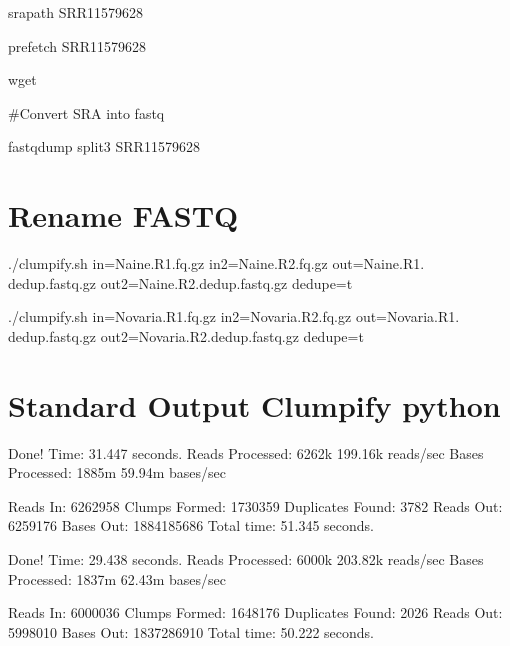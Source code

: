 \documentclass[letterpaper,10pt,english]{sphinxhowto}
\begin{document}
\sphinxAtStartPar
srapath SRR11579628

\sphinxAtStartPar
prefetch SRR11579628

\sphinxAtStartPar
wget 

\sphinxAtStartPar
\#Convert SRA into fastq

\sphinxAtStartPar
fastq\sphinxhyphen{}dump \textendash{}split\sphinxhyphen{}3 SRR11579628


\section{Rename FASTQ}
\label{\detokenize{CNV:rename-fastq}}
\sphinxAtStartPar
{}

\sphinxAtStartPar
{}

\sphinxAtStartPar
./clumpify.sh in=Naine.R1.fq.gz in2=Naine.R2.fq.gz out=Naine.R1.
dedup.fastq.gz out2=Naine.R2.dedup.fastq.gz dedupe=t

\sphinxAtStartPar
./clumpify.sh in=Novaria.R1.fq.gz in2=Novaria.R2.fq.gz out=Novaria.R1.
dedup.fastq.gz out2=Novaria.R2.dedup.fastq.gz dedupe=t


\section{Standard Output Clumpify python}
\label{\detokenize{CNV:standard-output-clumpify-python}}
\sphinxAtStartPar
Done!
Time:                           31.447 seconds.
Reads Processed:         6262k  199.16k reads/sec
Bases Processed:         1885m  59.94m bases/sec

\sphinxAtStartPar
Reads In:              6262958
Clumps Formed:         1730359
Duplicates Found:         3782
Reads Out:             6259176
Bases Out:          1884185686
Total time:     51.345 seconds.

\sphinxAtStartPar
{}

\sphinxAtStartPar
Done!
Time:                           29.438 seconds.
Reads Processed:         6000k  203.82k reads/sec
Bases Processed:         1837m  62.43m bases/sec

\sphinxAtStartPar
Reads In:              6000036
Clumps Formed:         1648176
Duplicates Found:         2026
Reads Out:             5998010
Bases Out:          1837286910
Total time:     50.222 seconds.
\end{document}

